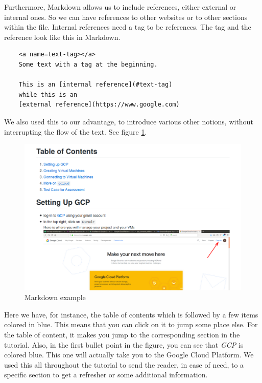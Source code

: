 Furthermore, Markdown allows us to include references, either external
or internal ones. So we can have references to other websites or to
other sections within the file. Internal references need a tag to be
references. The tag and the reference look like this in Markdown.

\begin{verbatim}
	<a name=text-tag></a>
	Some text with a tag at the beginning.

	This is an [internal reference](#text-tag)
	while this is an
	[external reference](https://www.google.com)
\end{verbatim}

We also used this to our advantage,
to introduce various other notions, without interrupting the flow of
the text. See figure \ref{fig:markdown}.

\begin{figure}
	\centering
	\includegraphics[width=.5\textwidth]{Images/markdown-showcase.png}
	\caption{Markdown example}
	\label{fig:markdown}
\end{figure}

Here we have, for instance, the table of contents which is followed by
a few items colored in blue. This means that you can click on it to
jump some place else. For the table of content, it makes you jump to
the corresponding section in the tutorial. Also, in the first bullet
point in the figure, you can see that \textit{GCP} is colored blue.
This one will actually take you to the Google Cloud Platform.  We used
this all throughout the tutorial to send the reader, in case of need,
to a specific section to get a refresher or some additional
information.
